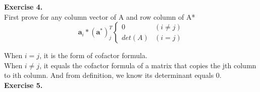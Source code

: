 \documentclass{article}
\begin{document}
\textbf{Exercise 4.}\\

    First prove for any column vector of A and row column of A*
    \[
    \mathbf{a}_i * (\mathbf{a}^*)^T_j\left\{
        \begin{aligned}
        0 &(i\neq j) \\
        det(A) &(i = j)       
        \end{aligned}
        \right.
    \]
    
    When $i=j$, it is the form of cofactor formula.\\

    When $i\neq j $, it equals the cofactor formula of a matrix that copies the jth column to ith column. And from definition, we know its determinant equals 0.\\


\textbf{Exercise 5.}\\
\end{document}

